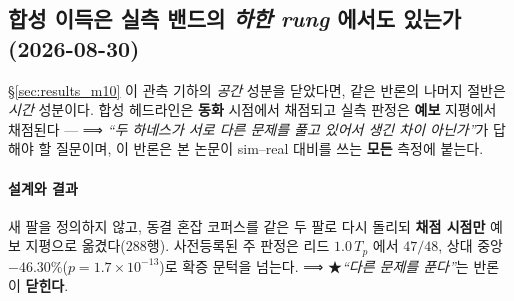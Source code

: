\documentclass[11pt]{report}
\numberwithin{equation}{chapter}
\numberwithin{figure}{chapter}
\numberwithin{table}{chapter}
\begin{document}
\subsection{합성 이득은 실측 밴드의 \emph{하한 rung} 에서도 있는가 (2026-08-30)}
\label{sec:results_t4}


\S\ref{sec:results_m10} 이 관측 기하의 \emph{공간} 성분을 닫았다면, 같은 반론의 나머지
절반은 \emph{시간} 성분이다. 합성 헤드라인은 \textbf{동화} 시점에서 채점되고 실측 판정은
\textbf{예보} 지평에서 채점된다 --- ⟹ \emph{``두 하네스가 서로 다른 문제를 풀고 있어서
생긴 차이 아닌가''}가 답해야 할 질문이며, 이 반론은 본 논문이 sim--real 대비를 쓰는
\textbf{모든} 측정에 붙는다.

\paragraph{설계와 결과}
새 팔을 정의하지 않고, 동결 혼잡 코퍼스를 같은 두 팔로 다시 돌리되 \textbf{채점 시점만}
예보 지평으로 옮겼다($288$행). 사전등록된 주 판정은 리드 $1.0\,T_p$ 에서
\textbf{$47/48$}, 상대 중앙 \textbf{$-46.30\%$}($p = 1.7\times10^{-13}$)로 확증 문턱을
넘는다. ⟹ ★\emph{``다른 문제를 푼다''}는 반론이 \textbf{닫힌다}.
\end{document}
